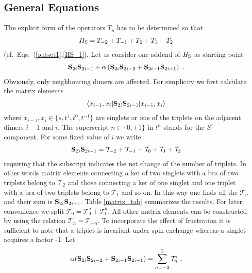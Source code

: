 \subsection{General Equations}
The explicit form of the operators $T_n$ has to be determined so that
\begin{equation}
\label{HS_Tn}
  H_{\rm S}=T_{-2}+T_{-1}+T_0+T_1+T_2
\end{equation}
(cf.~Eqs.~(\ref{outset1},\ref{HS_1}). 
Let us consider one addend of $H_{\rm S}$ as  starting point
\begin{equation}
\label{HS_summand}
  {\bf S}_{2i}{\bf S}_{2i-1}+\alpha\left({\bf S}_{2i}{\bf S}_{2i-2}+
{\bf S}_{2i-1}{\bf S}_{2i+1}\right) \ .
\end{equation}
Obviously, only neighbouring dimers are affected. For simplicity we first 
calculate the matrix elements
\begin{equation}
\label{matrix_el}
  \langle x_{i-1},x_i|{\bf S}_{2i}{\bf S}_{2i-1}|x_{i-1},x_i \rangle
\end{equation}
where $x_{i-1},x_i\in\{s,t^1,t^0,t^{-1}\}$ are singlets or one of the triplets
 on the adjacent dimers $i-1$ and $i$. The superscript $n\in\{0,\pm1\}$
 in $t^n$ stands for the $S^z$ component. For some fixed value of $i$ we write 
\begin{equation}
\label{ohne_frust}
 {\bf S}_{2i}{\bf S}_{2i-1} = {\mathcal{T}}_{-2}+{\mathcal{T}}_{-1}+
{\mathcal{T}}_{0}+{\mathcal{T}}_{1}+{\mathcal{T}}_{2}
\end{equation}
requiring that the subscript indicates the net change of the number of
triplets.  In other words
matrix elements connecting a ket of two singlets with a bra of 
two triplets belong to ${\mathcal{T}}_{ 2}$ and those connecting a ket of one 
singlet and one triplet with a bra of two triplets belong to 
${\mathcal{T}}_{ 1}$ and so on.
 In this way one finds all the 
${\mathcal{T}}_{ n}$ and their sum is ${\bf S}_{2i}{\bf S}_{2i-1}$. 
Table \ref{matrix_tab} summarizes the results. For later convenience we split
 ${\mathcal T}_0 = {\mathcal T}_0^a+{\mathcal T}_0^b$.
All other matrix elements can be constructed by using the relation 
${\mathcal{T}}_{ n}^{\dagger}={\mathcal{T}}_{-n}$.
To incorporate the effect of frustration
 it is sufficient to note that a triplet
 is invariant under spin exchange whereas a singlet acquires a factor -1. Let
\begin{equation}
\label{mit_frust}
  \alpha({\bf S}_{2i}{\bf S}_{2i-2}+{\bf S}_{2i-1}{\bf S}_{2i+1}) = 
\sum_{n=-2}^2{\mathcal{T}}'_{n}\ .
\end{equation}
